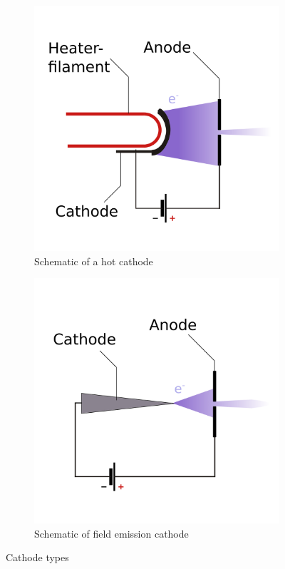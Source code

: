 \begin{figure}
	\centering
	\begin{subfigure}{0.4\textwidth}
		\centering
		\includegraphics[width=\textwidth]{Chapters/CRT-Basics/HotCathode}
		\caption{Schematic of a hot cathode}
		\label{fig:hotcathode}
	\end{subfigure}%
	\hspace{0.1\textwidth}
	\begin{subfigure}{0.4\textwidth}
		\centering
		\includegraphics[width=\textwidth]{Chapters/CRT-Basics/ColdCathode}
		
		\caption{Schematic of field emission cathode}
		\label{fig:coldcathode}
	\end{subfigure}
	\caption{Cathode types}
	\label{fig:cathodes}
\end{figure}

